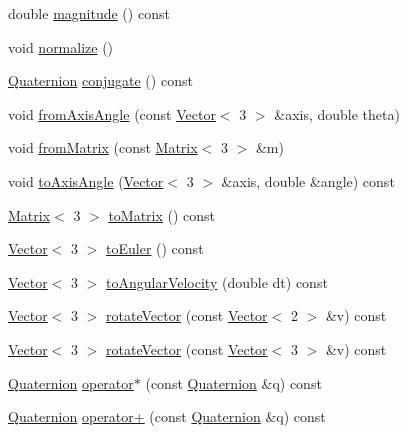 \begin{DoxyCompactItemize}
\item 
double \hyperlink{classimu_1_1Quaternion_a303e885722b8e811dbfb67219cffad69}{magnitude} () const 
\item 
void \hyperlink{classimu_1_1Quaternion_a02870e5bfac393523596d72c5dc02b7a}{normalize} ()
\item 
\hyperlink{classimu_1_1Quaternion}{Quaternion} \hyperlink{classimu_1_1Quaternion_a7c293462dfb4a0e8d9d84dc9d4ef8c3b}{conjugate} () const 
\item 
void \hyperlink{classimu_1_1Quaternion_aaac546f44b46ee6ebe5303969ad8c0df}{from\+Axis\+Angle} (const \hyperlink{classimu_1_1Vector}{Vector}$<$ 3 $>$ \&axis, double theta)
\item 
void \hyperlink{classimu_1_1Quaternion_acd5ad62c15a3920bd18e2f576a15b7e6}{from\+Matrix} (const \hyperlink{classimu_1_1Matrix}{Matrix}$<$ 3 $>$ \&m)
\item 
void \hyperlink{classimu_1_1Quaternion_a65e8d716d77df9d70bf6c0e313e88196}{to\+Axis\+Angle} (\hyperlink{classimu_1_1Vector}{Vector}$<$ 3 $>$ \&axis, double \&angle) const 
\item 
\hyperlink{classimu_1_1Matrix}{Matrix}$<$ 3 $>$ \hyperlink{classimu_1_1Quaternion_abdf3bf7a6c22ea67894945f19144d6b6}{to\+Matrix} () const 
\item 
\hyperlink{classimu_1_1Vector}{Vector}$<$ 3 $>$ \hyperlink{classimu_1_1Quaternion_ac664389c50719e2ac805af5656078667}{to\+Euler} () const 
\item 
\hyperlink{classimu_1_1Vector}{Vector}$<$ 3 $>$ \hyperlink{classimu_1_1Quaternion_a7411f537a96490d0caa49fdab0dffadd}{to\+Angular\+Velocity} (double dt) const 
\item 
\hyperlink{classimu_1_1Vector}{Vector}$<$ 3 $>$ \hyperlink{classimu_1_1Quaternion_a780a775b1a5447336d9fb354cab12ab5}{rotate\+Vector} (const \hyperlink{classimu_1_1Vector}{Vector}$<$ 2 $>$ \&v) const 
\item 
\hyperlink{classimu_1_1Vector}{Vector}$<$ 3 $>$ \hyperlink{classimu_1_1Quaternion_a95b5e9bad4241c71812fe13522c9e200}{rotate\+Vector} (const \hyperlink{classimu_1_1Vector}{Vector}$<$ 3 $>$ \&v) const 
\item 
\hyperlink{classimu_1_1Quaternion}{Quaternion} \hyperlink{classimu_1_1Quaternion_ad8634c2bc91dda56c138d8842777014c}{operator$\ast$} (const \hyperlink{classimu_1_1Quaternion}{Quaternion} \&q) const 
\item 
\hyperlink{classimu_1_1Quaternion}{Quaternion} \hyperlink{classimu_1_1Quaternion_afff27176db151aa705f163742b671a3d}{operator+} (const \hyperlink{classimu_1_1Quaternion}{Quaternion} \&q) const 

\end{DoxyCompactItemize}
